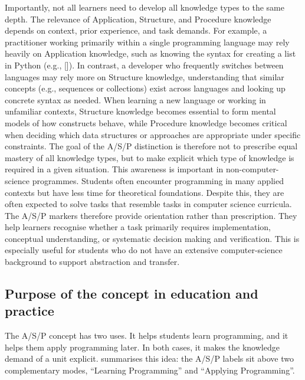 \documentclass{article}
\begin{document}
Importantly, not all learners need to develop all knowledge types to the same depth. The relevance of Application, Structure, and Procedure knowledge depends on context, prior experience, and task demands. 
%
For example, a practitioner working primarily within a single programming language may rely heavily on Application knowledge, such as knowing the syntax for creating a list in Python (e.g., []). In contrast, a developer who frequently switches between languages may rely more on Structure knowledge, understanding that similar concepts (e.g., sequences or collections) exist across languages and looking up concrete syntax as needed. 
%
When learning a new language or working in unfamiliar contexts, Structure knowledge becomes essential to form mental models of how constructs behave, while Procedure knowledge becomes critical when deciding which data structures or approaches are appropriate under specific constraints.
% 
The goal of the A/S/P distinction is therefore not to prescribe equal mastery of all knowledge types, but to make explicit which type of knowledge is required in a given situation. 
This awareness is important in non-computer-science programmes. Students often encounter programming in many applied contexts but have less time for theoretical foundations. Despite this, they are often expected to solve tasks that resemble tasks in computer science curricula. 
The A/S/P markers therefore provide orientation rather than prescription. They help learners recognise whether a task primarily requires implementation, conceptual understanding, or systematic decision making and verification. This is especially useful for students who do not have an extensive computer-science background to support abstraction and transfer.



\subsection{Purpose of the concept in education and practice}

The A/S/P concept has two uses. It helps students learn programming, and it helps them apply programming later. In both cases, it makes the knowledge demand of a unit explicit.  summarises this idea: the A/S/P labels sit above two complementary modes, ``Learning Programming'' and ``Applying Programming''. 
\end{document}
